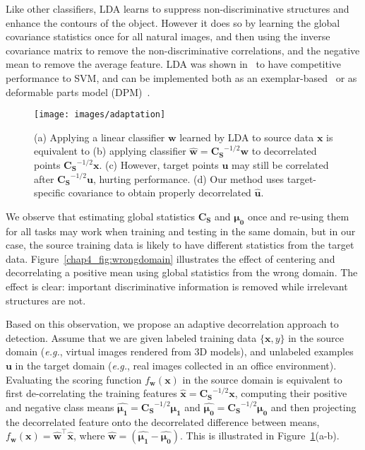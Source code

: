 \documentclass[graybox]{svmult}
\newcommand{\xSrc}{\vec{x}}
\newcommand{\ySrc}{y}
\newcommand{\xTar}{\vec{u}}
\newcommand{\wSrc}{\vec{w}}
\newcommand\mat[1]{\mathbf{#1}}
\renewcommand\vec[1]{\mathbf{#1}}
\newcommand\eg{\emph{e.g.}}
\newcommand{\muPosSrc}{\mathbf{\mu_{1}}}
\newcommand{\muNegSrc}{\vec{\mu_{0}}}
\newcommand{\sigSrc}{\mat{C_S}}
\begin{document}
Like other classifiers, LDA learns to suppress non-discriminative structures and enhance the contours of the object. However it does so by learning the global covariance statistics once for all natural images, and then using the inverse covariance matrix to remove the non-discriminative correlations, and the negative mean to remove the average feature. LDA was shown in~\cite{who} to have competitive performance to SVM, and can be implemented both as an exemplar-based~\cite{exemplarsvm} or as deformable parts model (DPM)~\cite{dpm}.

\begin{figure}[t]
\centering
\texttt{[image: images/adaptation]}
\caption{\small (a) Applying a linear classifier $\wSrc$ learned by LDA to source data $\xSrc$  is equivalent to (b) applying classifier $\hat{\wSrc}=\sigSrc^{-1/2}\wSrc$ to decorrelated points $\sigSrc^{-1/2}\xSrc$. (c) However, target points $\xTar$ may still be correlated after $\sigSrc^{-1/2}\xTar$, hurting performance. (d) Our method uses target-specific covariance to obtain properly decorrelated $\hat{\xTar}$. }
\label{chap4_fig:adapt}
\end{figure}

We observe that estimating global statistics  $\sigSrc$ and $\muNegSrc$ once and re-using them for all tasks may work when training and testing in the same domain, but in our case, the source training data is likely to have different statistics from the target data. Figure~\ref{chap4_fig:wrongdomain} illustrates the effect of centering and decorrelating a positive mean using global statistics from the wrong domain. The effect is clear: important discriminative information is removed while irrelevant structures are not. 

Based on this observation, we propose an adaptive decorrelation approach to detection. Assume that we are given labeled training data $\{ \xSrc, \ySrc \}$ in the source domain (\eg, virtual images rendered from 3D models), and unlabeled examples $\xTar$ in the target domain (\eg, real images collected in an office environment). Evaluating the scoring function $f_{\wSrc}(\xSrc)$ in the source domain is equivalent to first de-correlating the training features 
$\hat{\xSrc} = {\sigSrc}^{-1/2} \xSrc$, 
computing their positive and negative class means 
$\hat{\muPosSrc} = {\sigSrc}^{-1/2} \muPosSrc $ 
and 
$\hat{\muNegSrc} = {\sigSrc}^{-1/2} \muNegSrc $ 
and then projecting the decorrelated feature onto the decorrelated difference between means, $f_{\wSrc}(\xSrc) = \hat{\vec{w}}^{\top} \hat{\xSrc}$, where $\hat{\wSrc}=(\hat{\muPosSrc} - \hat{\muNegSrc})$.
This is illustrated in Figure~\ref{chap4_fig:adapt}(a-b).
\end{document}
